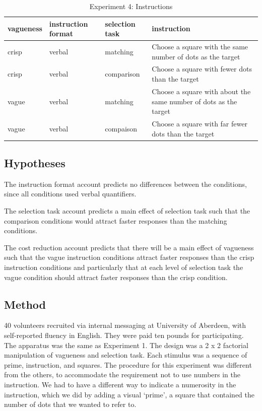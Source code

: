 \begin{table}[htbp]
\centering
\caption{Experiment 4: Instructions}
\label{instructionse4}
\begin{tabular}{lllp{7cm}}
\hline
vagueness&instruction format& selection task&instruction\\
\hline
crisp & verbal&matching & Choose a square with the same number of dots as the target \\ 
crisp & verbal&comparison& Choose a square with fewer dots than the target \\
vague & verbal&matching & Choose a square with about the same number of dots as the target \\ 
vague & verbal&compaison& Choose a square with far fewer dots than the target \\ 
\hline
\end{tabular}
\end{table}

\subsection{Hypotheses}
The instruction format account predicts no differences between the conditions, since all conditions used verbal quantifiers.

The selection task account predicts a main effect of selection task such that the comparison conditions would attract faster responses than the matching conditions.

The cost reduction account predicts that there will be a main effect of vagueness such that the vague instruction conditions attract faster responses than the crisp instruction conditions and particularly that at each level of selection task the vague condition should attract faster responses than the crisp condition.

\subsection{Method}

40 volunteers recruited via internal messaging at University of Aberdeen, with self-reported fluency in English. They were paid ten pounds for participating. 
The apparatus was the same as Experiment 1.
The design was a 2 x 2 factorial manipulation of vagueness and selection task.
Each stimulus was a sequence of prime, instruction, and squares.
The procedure for this experiment was different from the others, to accommodate the requirement not to use numbers in the instruction. We had to have a different way to indicate a numerosity in the instruction, which we did by adding a visual `prime', a square that contained the number of dots that we wanted to refer to.

